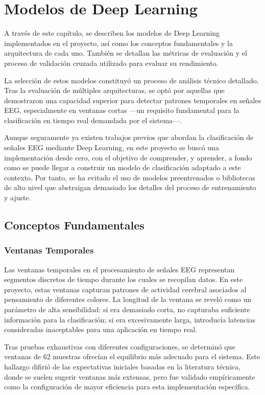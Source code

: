 \chapter{Modelos de Deep Learning}\label{ch:deep_learning_models}

A través de este capítulo, se describen los modelos de Deep Learning \cite{raschka2022machine} implementados en el proyecto, así como los conceptos fundamentales y la arquitectura de cada uno. También se detallan las métricas de evaluación y el proceso de validación cruzada utilizado para evaluar su rendimiento.

La selección de estos modelos constituyó un proceso de análisis técnico detallado. Tras la evaluación de múltiples arquitecturas, se optó por aquellas que demostraron una capacidad superior para detectar patrones temporales en señales EEG, especialmente en ventanas cortas —un requisito fundamental para la clasificación en tiempo real demandada por el sistema—.

Aunque seguramente ya existen trabajos previos que abordan la clasificación de señales EEG mediante Deep Learning, en este proyecto se buscó una implementación desde cero, con el objetivo de comprender, y aprender, a fondo como se puede llegar a construir un modelo de clasificación adaptado a este contexto. Por tanto, se ha evitado el uso de modelos preentrenados o bibliotecas de alto nivel que abstraigan demasiado los detalles del proceso de entrenamiento y ajuste.

\section{Conceptos Fundamentales}

\subsection{Ventanas Temporales}
Las ventanas temporales en el procesamiento de señales EEG representan segmentos discretos de tiempo durante los cuales se recopilan datos. En este proyecto, estas ventanas capturan patrones de actividad cerebral asociados al pensamiento de diferentes colores. La longitud de la ventana se reveló como un parámetro de alta sensibilidad: si era demasiado corta, no capturaba suficiente información para la clasificación; si era excesivamente larga, introducía latencias consideradas inaceptables para una aplicación en tiempo real.

Tras pruebas exhaustivas con diferentes configuraciones, se determinó que ventanas de 62 muestras ofrecían el equilibrio más adecuado para el sistema. Este hallazgo difirió de las expectativas iniciales basadas en la literatura técnica, donde se suelen sugerir ventanas más extensas, pero fue validado empíricamente como la configuración de mayor eficiencia para esta implementación específica.

